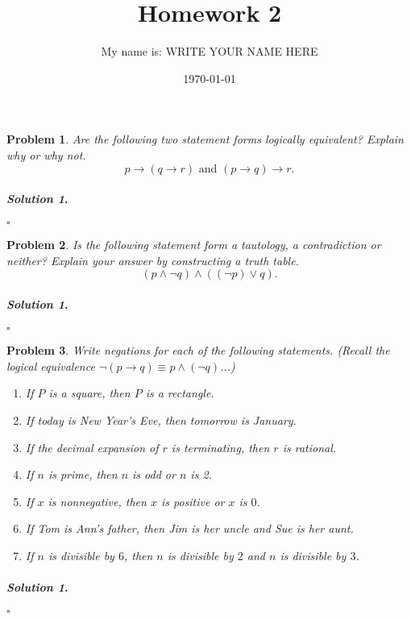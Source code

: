 \documentclass{amsart}
\theoremstyle{plain}
\newtheorem{problem}{Problem}
\newenvironment{solution}{\paragraph{\emph{Solution 1}.}}{\hfill$\square$}
\begin{document}
 

\title[Homework 2]{Homework 2}
\author{My name is:  WRITE YOUR NAME HERE}  %
\date{\today} 
\maketitle 

\begin{problem}
Are the following two statement forms logically equivalent?  Explain why or why not.
$$p \to (q \to r) \text{ and } (p \to q) \to r. $$
\end{problem}
\begin{solution}
\end{solution}

\begin{problem}
Is the following statement form a tautology, a contradiction or neither?  Explain your answer by constructing a truth table.
$$(p \land \neg q) \land( (\neg p) \lor q). $$
\end{problem}
\begin{solution}

\end{solution}

\begin{problem} \label{prob}
Write negations for each of the following statements.  (Recall the logical equivalence $\neg(p \to q) \equiv p \land (\neg q)$...)
\begin{enumerate}
\item If $P$ is a square, then $P$ is a rectangle.
\item If today is New Year's Eve, then tomorrow is January.
\item If the decimal expansion of $r$ is terminating, then $r$ is rational.
\item If $n$ is prime, then $n$ is odd or $n$ is 2.
\item If $x$ is nonnegative, then $x$ is positive or $x$ is $0$.
\item If Tom is Ann's father, then Jim is her uncle and Sue is her aunt.
\item If $n$ is divisible by $6$, then $n$ is divisible by $2$ and $n$ is divisible by $3$.
\end{enumerate}
\end{problem}
\begin{solution}

\end{solution}
\end{document}
